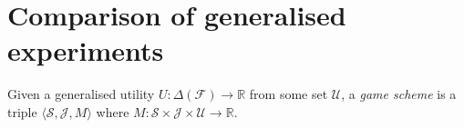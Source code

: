\section{Comparison of generalised experiments}

Given a generalised utility $U:\Delta(\mathcal{F})\to \mathbb{R}$ from some set $\mathscr{U}$, a \emph{game scheme} is a triple $\langle \mathscr{S},\mathscr{J},M\rangle$ where $M:\mathscr{S}\times\mathscr{J}\times\mathscr{U}\to \mathbb{R}$.